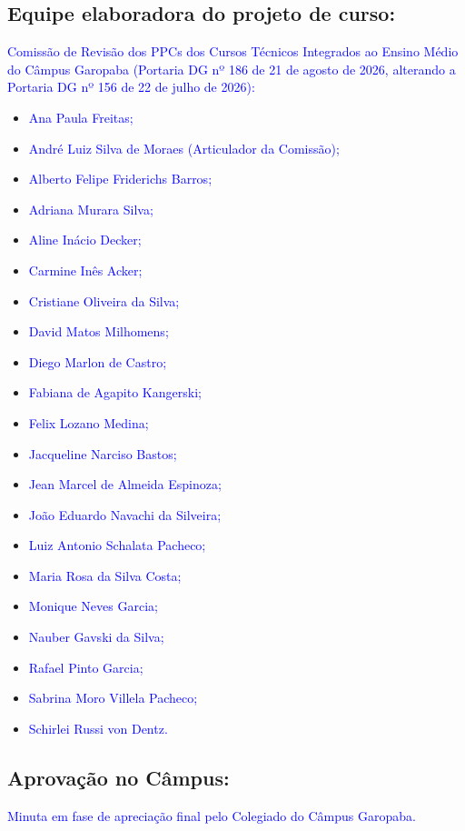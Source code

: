 \documentclass{../../modelos/latex-shared/ifsc-ppc}
\newcommand{\revisao}[1]{\textcolor{blue}{#1}}
\newcommand{\revisao}[1]{#1}
\begin{document}
\subsection{Equipe elaboradora do projeto de curso:}
\revisao{Comissão de Revisão dos PPCs dos Cursos Técnicos Integrados ao Ensino Médio do Câmpus Garopaba (Portaria DG nº 186 de 21 de agosto de 2026, alterando a Portaria DG nº 156 de 22 de julho de 2026):}
\begin{itemize}
    \item \revisao{Ana Paula Freitas;}
    \item \revisao{André Luiz Silva de Moraes (Articulador da Comissão);}
    \item \revisao{Alberto Felipe Friderichs Barros;}
    \item \revisao{Adriana Murara Silva;}
    \item \revisao{Aline Inácio Decker;}
    \item \revisao{Carmine Inês Acker;}
    \item \revisao{Cristiane Oliveira da Silva;}
    \item \revisao{David Matos Milhomens;}
    \item \revisao{Diego Marlon de Castro;}
    \item \revisao{Fabiana de Agapito Kangerski;}
    \item \revisao{Felix Lozano Medina;}
    \item \revisao{Jacqueline Narciso Bastos;}
    \item \revisao{Jean Marcel de Almeida Espinoza;}
    \item \revisao{João Eduardo Navachi da Silveira;}
    \item \revisao{Luiz Antonio Schalata Pacheco;}
    \item \revisao{Maria Rosa da Silva Costa;}
    \item \revisao{Monique Neves Garcia;}
    \item \revisao{Nauber Gavski da Silva;}
    \item \revisao{Rafael Pinto Garcia;}
    \item \revisao{Sabrina Moro Villela Pacheco;}
    \item \revisao{Schirlei Russi von Dentz.}
\end{itemize}

\subsection{Aprovação no Câmpus:}
\revisao{Minuta em fase de apreciação final pelo Colegiado do Câmpus Garopaba.}
\end{document}
